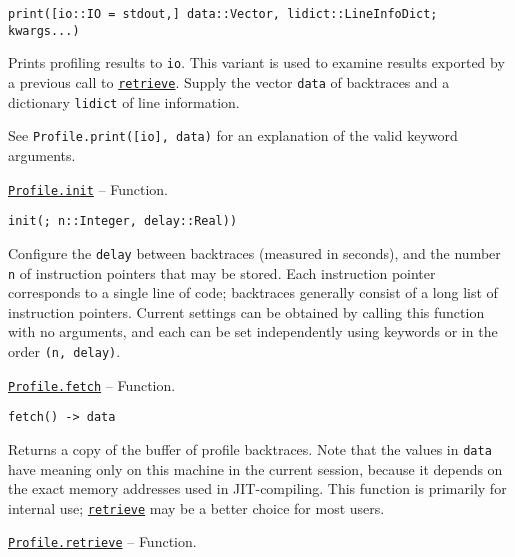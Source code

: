 \begin{adjustwidth}{2em}{0pt}
\begin{itemize}
\end{itemize}



\begin{lstlisting}
print([io::IO = stdout,] data::Vector, lidict::LineInfoDict; kwargs...)
\end{lstlisting}

Prints profiling results to \texttt{io}. This variant is used to examine results exported by a previous call to \hyperlink{10202508103131430980}{\texttt{retrieve}}. Supply the vector \texttt{data} of backtraces and a dictionary \texttt{lidict} of line information.

See \texttt{Profile.print([io], data)} for an explanation of the valid keyword arguments.



\end{adjustwidth}
\hypertarget{11074776852943687092}{}
\hyperlink{11074776852943687092}{\texttt{Profile.init}}  -- {Function.}

\begin{adjustwidth}{2em}{0pt}


\begin{verbatim}
init(; n::Integer, delay::Real))
\end{verbatim}

Configure the \texttt{delay} between backtraces (measured in seconds), and the number \texttt{n} of instruction pointers that may be stored. Each instruction pointer corresponds to a single line of code; backtraces generally consist of a long list of instruction pointers. Current settings can be obtained by calling this function with no arguments, and each can be set independently using keywords or in the order \texttt{(n, delay)}.



\end{adjustwidth}
\hypertarget{3578108280181558112}{}
\hyperlink{3578108280181558112}{\texttt{Profile.fetch}}  -- {Function.}

\begin{adjustwidth}{2em}{0pt}


\begin{verbatim}
fetch() -> data
\end{verbatim}

Returns a copy of the buffer of profile backtraces. Note that the values in \texttt{data} have meaning only on this machine in the current session, because it depends on the exact memory addresses used in JIT-compiling. This function is primarily for internal use; \hyperlink{10202508103131430980}{\texttt{retrieve}} may be a better choice for most users.



\end{adjustwidth}
\hypertarget{10202508103131430980}{}
\hyperlink{10202508103131430980}{\texttt{Profile.retrieve}}  -- {Function.}

